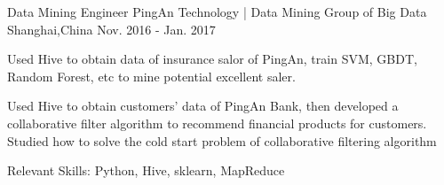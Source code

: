 \vspace{-20pt}
\begin{cventries}
  \cventry
    {Data Mining Engineer}
    {PingAn Technology | Data Mining Group of Big Data}
    {Shanghai,China}
    {Nov. 2016 - Jan. 2017}
    {
        \begin{cvitems}
        \item {Used Hive to obtain data of insurance salor of PingAn, train SVM, GBDT, Random Forest, etc to mine potential excellent saler.}
        \item {Used Hive to obtain customers' data of PingAn Bank, then developed a collaborative filter algorithm to recommend financial products for customers. Studied how to solve the cold start problem of collaborative filtering algorithm}
        \item {Relevant Skills: Python, Hive, sklearn, MapReduce}
      \end{cvitems}
    }
\end{cventries}
